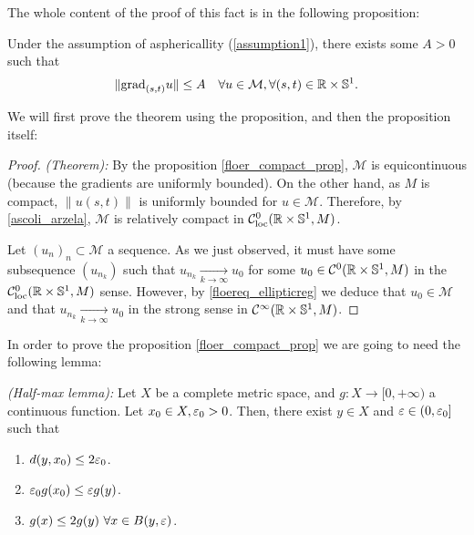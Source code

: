 The whole content of the proof of this fact is in the following proposition:

\begin{prop} \label{floer_compact_prop}
Under the assumption of asphericallity (\ref{assumption1}), there exists some $A > 0$ such that
\[\|\grad_{(s,t)}u\| \leq A \ \ \ \forall u \in \mathcal{M}, \forall (s,t) \in \R \times \con{S}^1 .\]
\end{prop}

We will first prove the theorem using the proposition, and then the proposition itself:

\begin{proof} {\it (Theorem):} By the proposition \ref{floer_compact_prop}, $\mathcal{M}$ is equicontinuous (because the gradients are uniformly bounded). On the other hand, as $M$ is compact, $\|u(s,t)\|$ is uniformly bounded for $u \in \mathcal{M}$. Therefore, by \ref{ascoli_arzela}, $\mathcal{M}$ is relatively compact in $\mathcal{C}_{\text{loc}}^0(\mathbb{R} \times \mathbb{S}^1,M)$.

Let $(u_n)_n \subset \mathcal{M}$ a sequence. As we just observed, it must have some subsequence $(u_{n_k})$ such that $u_{n_k} \xrightarrow[k \rightarrow \infty]{} u_0$ for some $u_0 \in \mathcal{C}^0(\mathbb{R}\times\mathbb{S}^1,M)$ in the $\mathcal{C}_{\text{loc}}^0(\mathbb{R}\times\mathbb{S}^1,M)$ sense. However, by \ref{floereq_ellipticreg} we deduce that $u_0 \in \mathcal{M}$ and that $u_{n_k} \xrightarrow[k\rightarrow \infty]{} u_0$ in the strong sense in $\mathcal{C}^{\infty}(\mathbb{R} \times \mathbb{S}^1,M)$.
\end{proof}

In order to prove the proposition \ref{floer_compact_prop} we are going to need the following lemma:

\begin{lema}
{\it (Half-max lemma):} Let $X$ be a complete metric space, and $g : X \rightarrow  [0,+\infty)$ a continuous function. Let $x_0 \in X, \varepsilon_0 > 0$. Then, there exist $y \in X$ and $\varepsilon \in (0,\varepsilon_0]$ such that
\begin{enumerate}
	\item $d(y,x_0) \leq 2\varepsilon_0$.
	\item $\varepsilon_0 g(x_0) \leq \varepsilon g(y)$.
	\item $g(x) \leq 2g(y) \ \forall x \in B(y,\varepsilon)$.
\end{enumerate}
\end{lema}

